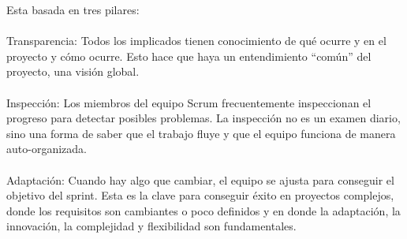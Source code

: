 Esta basada en tres pilares:
\\
\\
Transparencia: Todos los implicados tienen conocimiento de qué ocurre y en el proyecto y cómo ocurre. Esto hace que haya un entendimiento “común” del proyecto, una visión global.
\\
\\
Inspección: Los miembros del equipo Scrum frecuentemente inspeccionan el progreso para detectar posibles problemas. La inspección no es un examen diario, sino una forma de saber que el trabajo fluye y que el equipo funciona de manera auto-organizada.
\\
\\
Adaptación: Cuando hay algo que cambiar, el equipo se ajusta para conseguir el objetivo del sprint. Esta es la clave para conseguir éxito en proyectos complejos, donde los requisitos son cambiantes o poco definidos y en donde la adaptación, la innovación, la complejidad y flexibilidad son fundamentales.



